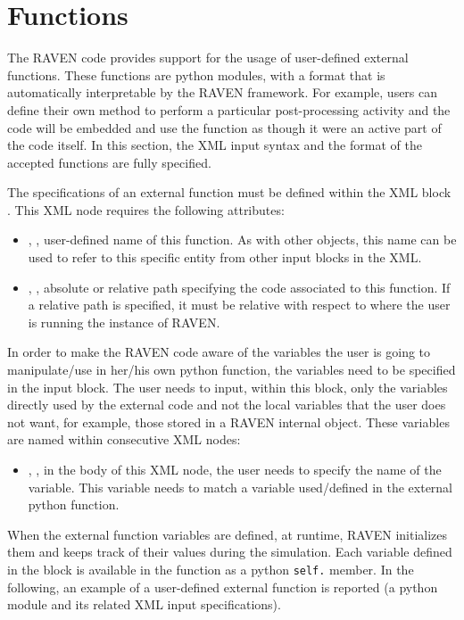 \section{Functions}
\label{sec:functions}




The RAVEN code provides support for the usage of user-defined external
functions.
%
These functions are python modules, with a format that is automatically
interpretable by the RAVEN framework.
%
For example, users can define their own method to perform a particular
post-processing activity and the code will be embedded and use the function as
though it were an active part of the code itself.
%
In this section, the XML input syntax and the format of the accepted functions
are fully specified.

The specifications of an external function must be defined within the XML block
.
%
This XML node requires the following attributes:
\vspace{-5mm}
\begin{itemize}
  \itemsep0em
  \item {}, , user-defined name
  of this function.
  \nb As with other objects, this name can be used to refer to this
  specific entity from other input blocks in the XML.
  \item {}, , absolute or
  relative path specifying the code associated to this function.
  \nb If a relative path is specified, it must be relative with respect
  to where the user is running the instance of RAVEN.
\end{itemize}
\vspace{-5mm}
In order to make the RAVEN code aware of the variables the user is going to
manipulate/use in her/his own python function, the variables need to be
specified in the  input block.
%
The user needs to input, within this block, only the variables directly used by
the external code and not the local variables that the user does not want,
for example, those stored in a RAVEN internal object.
%
These variables are named within consecutive
 XML nodes:
\begin{itemize}
  \item {}, , in the body of
  this XML node, the user needs to specify the name of the variable.
  This variable needs to match a variable used/defined in the external python
  function.
\end{itemize}
When the external function variables are defined, at runtime, RAVEN initializes
them and keeps track of their values during the simulation.
%
Each variable defined in the  block is available in the
function as a python \texttt{self.} member. In the following, an example of a
user-defined external function is reported (a python module and its related XML
input specifications).

